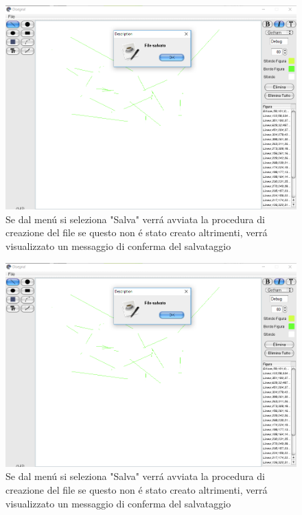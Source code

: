 \documentclass[a4paper,12pt,times,numbered,print,index]{article}
\begin{document}
\begin{figure}
  \includegraphics[scale=.5]{Immagini/Debug/test4.png}
  \caption[Salvataggio file]{Se dal menú si seleziona "Salva" verrá avviata la procedura di creazione del file se questo non é stato creato altrimenti, verrá visualizzato un messaggio di conferma del salvataggio}
\end{figure}

\begin{figure}
  \includegraphics[scale=.5]{Immagini/Debug/test4.png}
  \caption[Salvataggio file]{Se dal menú si seleziona "Salva" verrá avviata la procedura di creazione del file se questo non é stato creato altrimenti, verrá visualizzato un messaggio di conferma del salvataggio}
\end{figure}


\printbibliography
\end{document}
